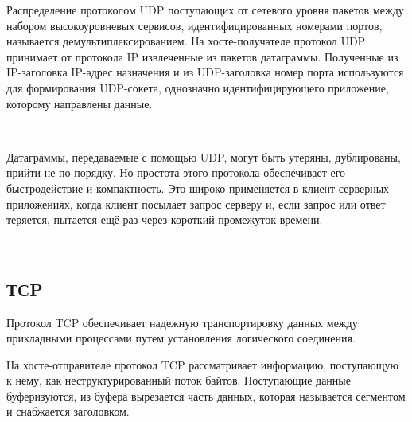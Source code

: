 \documentclass{article}
\begin{document}
Распределение протоколом UDP поступающих от сетевого уровня пакетов между набором высокоуровневых сервисов, идентифицированных номерами портов, называется демультиплексированием. На хосте-получателе протокол UDP принимает от протокола IP извлеченные из пакетов датаграммы. Полученные из IP-заголовка IP-адрес назначения и из UDP-заголовка номер порта используются для формирования UDP-сокета, однозначно идентифицирующего приложение, которому направлены данные. 
\begin{figure}[h]
\end{figure}
~\

Датаграммы, передаваемые с помощью UDP, могут быть утеряны, дублированы, прийти не по порядку. Но простота этого протокола обеспечивает его быстродействие и компактность.
Это широко применяется в клиент-серверных приложениях, когда клиент посылает запрос серверу и, если запрос или ответ теряется, пытается ещё раз через короткий промежуток времени.

~\

\newpage

\subsection{\textbf{ТСP}}

Протокол TCP обеспечивает надежную транспортировку данных между прикладными процессами путем установления логического соединения. 

На хосте-отправителе протокол TCP рассматривает информацию, поступающую к нему, как неструктурированный поток байтов. Поступающие данные буферизуются, из буфера вырезается часть данных, которая называется сегментом и снабжается заголовком.
\end{document}
